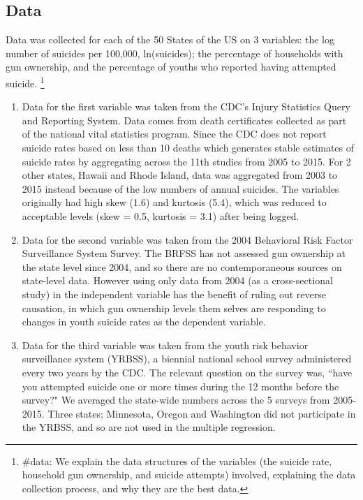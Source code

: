 \documentclass{article}
\begin{document}
\subsection*{Data}

Data was collected for each of the 50 States of the US on 3 variables: the log number of suicides per 100,000, ln(suicides); the percentage of households with gun ownership, and the percentage of youths who reported having attempted suicide. \footnote{\#data: We explain the data structures of the variables (the suicide rate, household gun ownership, and suicide attempts) involved, explaining the data collection process, and why they are the best data.}
\begin{enumerate}
	\item Data for the first variable was taken from the CDC's Injury Statistics Query and Reporting System. Data comes from death certificates collected as part of the national vital statistics program. Since the CDC does not report suicide rates based on less than 10 deaths which generates stable estimates of suicide rates by aggregating across the 11th studies from 2005 to 2015. For 2 other states, Hawaii and Rhode Island, data was aggregated from 2003 to 2015 instead because of the low numbers of annual suicides. The variables originally had high skew (1.6) and kurtosis (5.4), which was reduced to acceptable levels (skew = 0.5, kurtosis = 3.1) after being logged.
	\item Data for the second variable was taken from the 2004 Behavioral Risk Factor Surveillance System Survey. The BRFSS has not assessed gun ownership at the state level since 2004, and so there are no contemporaneous sources on state-level data. However using only data from 2004 (as a cross-sectional study) in the independent variable has the benefit of ruling out reverse causation, in which gun ownership levels them selves are responding to changes in youth suicide rates as the dependent variable.
	\item Data for the third variable was taken from the youth risk behavior surveillance system (YRBSS), a biennial national school survey administered every two years by the CDC. The relevant question on the survey was, ``have you attempted suicide one or more times during the 12 months before the survey?" We averaged the state-wide numbers across the 5 surveys from 2005-2015. Three states; Minnesota, Oregon and Washington did not participate in the YRBSS, and so are not used in the multiple regression.

\end{enumerate}
\end{document}

